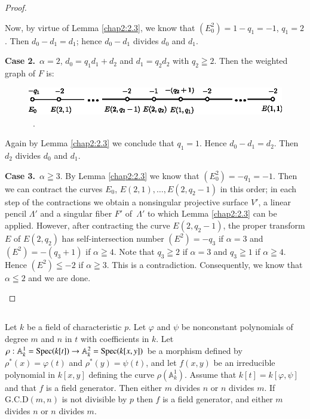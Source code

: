 \begin{proof}
\begin{enumerate}
\noindent
Now, by virtue of Lemma \ref{chap2:2.3}, we know that
$(E^{2}_{0})=1-q_{1}=-1$, \iec $q_{1}=2$. Then $d_{0}-d_{1}=d_{1}$;
hence $d_{0}-d_{1}$ divides $d_{0}$ and $d_{1}$.

{\bf Case 2.}~$\alpha=2$, \iec $d_{0}=q_{1}d_{1}+d_{2}$ and
$d_{1}=q_{2}d_{2}$ with $q_{2}\geqq 2$. Then the weighted graph of $F$
is:
\begin{figure}[H]
\centering
\includegraphics{figures/chap2-fig5.eps} \ .
\end{figure}

Again by Lemma \ref{chap2:2.3} we conclude that $q_{1}=1$. Hence
$d_{0}-d_{1}=d_{2}$. Then $d_{2}$ divides $d_{0}$ and $d_{1}$.

{\bf Case 3.}~$\alpha\geqq 3$. By Lemma \ref{chap2:2.3} we know that
$(E^{2}_{0})=-q_{1}=-1$. Then we can contract the curves $E_{0}$,
$E(2,1),\ldots,E(2,q_{2}-1)$ in this order; in each step of the
contractions we obtain a nonsingular projective surface $V'$, a linear
pencil $\Lambda'$ and a singular fiber $F'$ of\pageoriginale\
$\Lambda'$ to which Lemma \ref{chap2:2.3} can be applied. However, after
contracting the curve $E(2,q_{2}-1)$, the proper transform $E$ of
$E(2,q_{2})$ has self-intersection number $(E^{2})=-q_{3}$ if
$\alpha=3$ and $(E^{2})=-(q_{3}+1)$ if $\alpha\geqq 4$. Note that
$q_{3}\geqq 2$ if $\alpha=3$ and $q_{3}\geqq 1$ if $\alpha\geqq
4$. Hence $(E^{2})\leqq -2$ if $\alpha\geqq 3$. This is a
contradiction. Consequently, we know that $\alpha\leqq 2$ and we are
done.
\end{enumerate}
\end{proof}

\subsection{}\label{chap2:3.2}
\begin{coro*}
  Let $k$ be a field of characteristic $p$. Let $\varphi$ and $\psi$ be
  nonconstant polynomials of degree $m$ and $n$ in $t$ with coefficients
  in $k$. Let $\rho:\mathbb{A}^{1}_{k}=\operatorname{Spec}(k[t])\to
  \mathbb{A}^{2}_{k}=\operatorname{Spec}(k[x,y])$ be a morphism defined by
  $\rho^{\ast}(x)=\varphi(t)$ and $\rho^{\ast}(y)=\psi(t)$, and let
  $f(x,y)$ be an irreducible polynomial in $k[x,y]$ defining the curve
  $\rho(\mathbb{A}^{1}_{k})$. Assume that $k[t]=k[\varphi,\psi]$ and
  that $f$ is a field generator. Then either $m$ divides $n$ or $n$
  divides $m$. If $\text{G.C.D}(m,n)$ is not divisible by $p$ then $f$
  is a field generator, and either $m$ divides $n$ or $n$ divides $m$.
\end{coro*}

